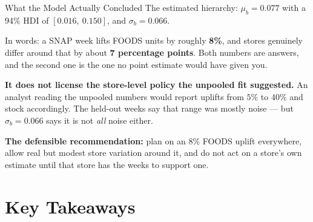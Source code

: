 \documentclass[aspectratio=169, 11pt]{beamer}
\begin{document}
\begin{frame}{What the Model Actually Concluded}
  The estimated hierarchy: $\mu_b = 0.077$ with a 94\% HDI of $[0.016,\ 0.150]$, and
  $\sigma_b = 0.066$.

  \vspace{0.1cm}
  In words: a SNAP week lifts FOODS units by roughly \textbf{8\%}, and stores genuinely differ
  around that by about \textbf{7 percentage points}. Both numbers are answers, and the second one
  is the one no point estimate would have given you.

  \begin{warningbox}
    \textbf{It does not license the store-level policy the unpooled fit suggested.} An analyst
    reading the unpooled numbers would report uplifts from $5\%$ to $40\%$ and stock accordingly.
    The held-out weeks say that range was mostly noise --- but $\sigma_b = 0.066$ says it is not
    \emph{all} noise either.
  \end{warningbox}

  \vspace{0.1cm}
  \textbf{The defensible recommendation:} plan on an 8\% FOODS uplift everywhere, allow real but
  modest store variation around it, and do not act on a store's own estimate until that store has
  the weeks to support one.
\end{frame}

\section{Key Takeaways}

\end{document}
